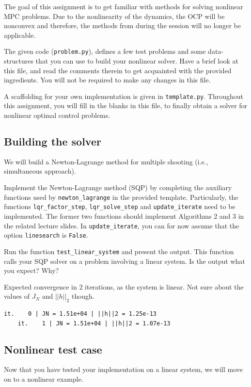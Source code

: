 \documentclass[]{article}
\begin{document}
The goal of this assignment is to get familiar with methods for solving nonlinear MPC problems. 
Due to the nonlinearity of the dynamics, the OCP
will be nonconvex and therefore, the methods from during the session will no longer be applicable. 

The given code (\texttt{problem.py}), 
defines a few test problems and some data-structures that 
you can use to build your nonlinear solver. Have a brief 
look at this file, and read the comments therein
to get acquainted with the provided ingredients.
You will not be required to make any changes 
in this file.  

A scaffolding for your own implementation is given 
in \texttt{template.py}. Throughout this 
assignment, you will fill in the blanks in this file, 
to finally obtain a solver for nonlinear optimal control problems.

\subsection{Building the solver}
We will build a Newton-Lagrange method 
for multiple shooting (i.e., simultaneous approach).

\begin{assignment}
	Implement the Newton-Lagrange method (SQP) by 
	completing the auxiliary functions used by \texttt{newton\_lagrange} in 
	the provided template. Particularly, 
	the functions \texttt{lqr\_factor\_step}, \texttt{lqr\_solve\_step}
	and \texttt{update\_iterate} need to be implemented. The former two functions should implement 
	Algorithms 2 and 3 in the related lecture slides. 
	In \texttt{update\_iterate}, you can for now assume that the option \texttt{linesearch} is \texttt{False}.

	Run the function \texttt{test\_linear\_system} and present the output.
	This function calls your SQP solver on a problem involving 
	a linear system. Is the output what you expect? Why?
\end{assignment}
\begin{flushleft}
	Expected convergence in 2 iterations, as the system is linear.
	Not sure about the values of $J_N$ and $||h||_2$ though.
\end{flushleft}
\begin{lstlisting}[style=python]
	it.    0 | JN = 1.51e+04 | ||h||2 = 1.25e-13
	it.    1 | JN = 1.51e+04 | ||h||2 = 1.07e-13
\end{lstlisting}


\subsection{Nonlinear test case}
Now that you have tested your implementation on a linear system,
we will move on to a nonlinear example.
\end{document}
